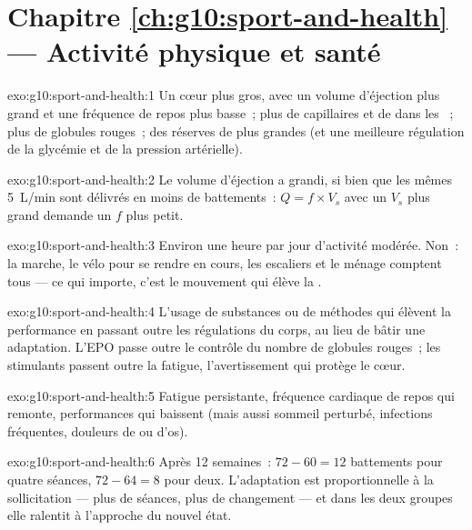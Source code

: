\section*{Chapitre \ref{ch:g10:sport-and-health} --- Activité physique et santé}

\begin{solution}{exo:g10:sport-and-health:1}
Un cœur plus gros, avec un volume d'éjection plus grand et une
fréquence de repos plus basse~; plus de capillaires et de 
dans les ~; plus de globules rouges~; des réserves de
 plus grandes (et une meilleure régulation de la glycémie et
de la pression artérielle).
\end{solution}

\begin{solution}{exo:g10:sport-and-health:2}
Le volume d'éjection a grandi, si bien que les mêmes \qty{5}{L/min}
sont délivrés en moins de battements~: $Q = f \times V_s$ avec un $V_s$
plus grand demande un $f$ plus petit.
\end{solution}

\begin{solution}{exo:g10:sport-and-health:3}
Environ une heure par jour d'activité modérée. Non~: la marche, le vélo
pour se rendre en cours, les escaliers et le ménage comptent tous ---
ce qui importe, c'est le mouvement qui élève la .
\end{solution}

\begin{solution}{exo:g10:sport-and-health:4}
L'usage de substances ou de méthodes qui élèvent la performance en
passant outre les régulations du corps, au lieu de bâtir une
adaptation. L'EPO passe outre le contrôle du nombre de globules
rouges~; les stimulants passent outre la fatigue, l'avertissement qui
protège le cœur.
\end{solution}

\begin{solution}{exo:g10:sport-and-health:5}
Fatigue persistante, fréquence cardiaque de repos qui remonte,
performances qui baissent (mais aussi sommeil perturbé, infections
fréquentes, douleurs de  ou d'os).
\end{solution}

\begin{solution}{exo:g10:sport-and-health:6}
Après 12 semaines~: $72 - 60 = 12$ battements pour quatre séances,
$72 - 64 = 8$ pour deux. L'adaptation est proportionnelle à la
sollicitation --- plus de séances, plus de changement --- et dans les
deux groupes elle ralentit à l'approche du nouvel état.
\end{solution}

